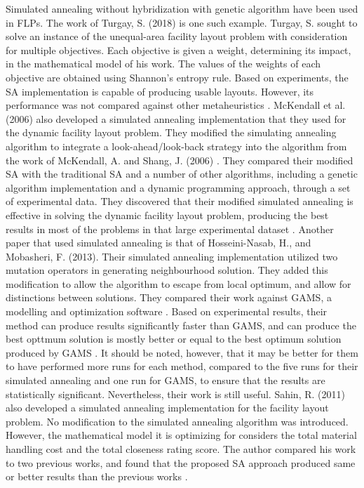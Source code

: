 Simulated annealing without hybridization with genetic algorithm have been used in FLPs. The work of Turgay, S. (2018) is one such example. Turgay, S. sought to solve an instance of the unequal-area facility layout problem with consideration for multiple objectives. Each objective is given a weight, determining its impact, in the mathematical model of his work. The values of the weights of each objective are obtained using Shannon's entropy rule. Based on experiments, the SA implementation is capable of producing usable layouts. However, its performance was not compared against other metaheuristics \cite{Turgay2018}. McKendall et al. (2006) also developed a simulated annealing implementation that they used for the dynamic facility layout problem. They modified the simulating annealing algorithm to integrate a look-ahead/look-back strategy into the algorithm from the work of McKendall, A. and Shang, J. (2006) \cite{McKendall2006Ant}. They compared their modified SA with the traditional SA and a number of other algorithms, including a genetic algorithm implementation and a dynamic programming approach, through a set of experimental data. They discovered that their modified simulated annealing is effective in solving the dynamic facility layout problem, producing the best results in most of the problems in that large experimental dataset \cite{McKendall2006}. Another paper that used simulated annealing is that of Hosseini-Nasab, H., and Mobasheri, F. (2013). Their simulated annealing implementation utilized two mutation operators in generating neighbourhood solution. They added this modification to allow the algorithm to escape from local optimum, and allow for distinctions between solutions. They compared their work against GAMS, a modelling and optimization software \cite{GAMSSoftware}. Based on experimental results, their method can produce results significantly faster than GAMS, and can produce the best opttmum solution is mostly better or equal to the best optimum solution produced by GAMS \cite{Nasab2013}. It should be noted, however, that it may be better for them to have performed more runs for each method, compared to the five runs for their simulated annealing and one run for GAMS, to ensure that the results are statistically significant. Nevertheless, their work is still useful. Sahin, R. (2011) also developed a simulated annealing implementation for the facility layout problem. No modification to the simulated annealing algorithm was introduced. However, the mathematical model it is optimizing for considers the total material handling cost and the total closeness rating score. The author compared his work to two previous works, and found that the proposed SA approach produced same or better results than the previous works \cite{Sahin2011}.

